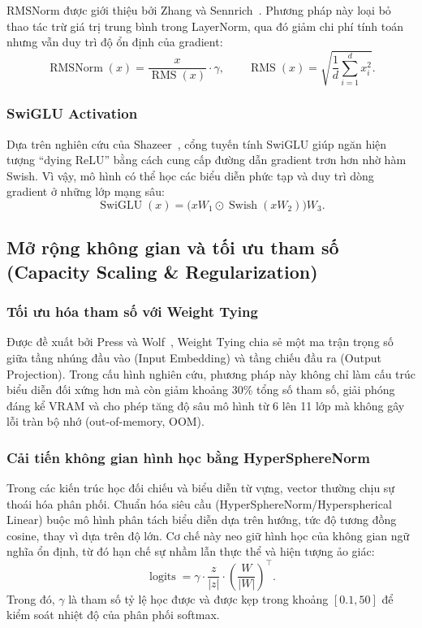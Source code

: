 \documentclass[11pt,a4paper]{article}
\numberwithin{equation}{section}
\DeclareMathOperator{\RMS}{RMS}
\begin{document}
RMSNorm được giới thiệu bởi Zhang và Sennrich~\cite{zhang2019rmsnorm}. Phương pháp này loại bỏ thao tác trừ giá trị trung bình trong LayerNorm, qua đó giảm chi phí tính toán nhưng vẫn duy trì độ ổn định của gradient:
\begin{equation}
\operatorname{RMSNorm}(x)
=\frac{x}{\RMS(x)}\cdot\gamma,
\qquad
\RMS(x)=\sqrt{\frac{1}{d}\sum_{i=1}^{d}x_i^2}.
\label{eq:rmsnorm}
\end{equation}

\subsubsection{SwiGLU Activation}

Dựa trên nghiên cứu của Shazeer~\cite{shazeer2020glu}, cổng tuyến tính SwiGLU giúp ngăn hiện tượng ``dying ReLU'' bằng cách cung cấp đường dẫn gradient trơn hơn nhờ hàm Swish. Vì vậy, mô hình có thể học các biểu diễn phức tạp và duy trì dòng gradient ở những lớp mạng sâu:
\begin{equation}
\operatorname{SwiGLU}(x)
=\bigl(xW_1\odot\operatorname{Swish}(xW_2)\bigr)W_3.
\label{eq:swiglu}
\end{equation}

\subsection{Mở rộng không gian và tối ưu tham số (Capacity Scaling \& Regularization)}

\subsubsection{Tối ưu hóa tham số với Weight Tying}

Được đề xuất bởi Press và Wolf~\cite{press2017using}, Weight Tying chia sẻ một ma trận trọng số giữa tầng nhúng đầu vào (Input Embedding) và tầng chiếu đầu ra (Output Projection). Trong cấu hình nghiên cứu, phương pháp này không chỉ làm cấu trúc biểu diễn đối xứng hơn mà còn giảm khoảng 30\% tổng số tham số, giải phóng đáng kể VRAM và cho phép tăng độ sâu mô hình từ 6 lên 11 lớp mà không gây lỗi tràn bộ nhớ (out-of-memory, OOM).

\subsubsection{Cải tiến không gian hình học bằng HyperSphereNorm}

Trong các kiến trúc học đối chiếu và biểu diễn từ vựng, vector thường chịu sự thoái hóa phân phối. Chuẩn hóa siêu cầu (HyperSphereNorm/Hyperspherical Linear) buộc mô hình phân tách biểu diễn dựa trên hướng, tức độ tương đồng cosine, thay vì dựa trên độ lớn. Cơ chế này neo giữ hình học của không gian ngữ nghĩa ổn định, từ đó hạn chế sự nhầm lẫn thực thể và hiện tượng ảo giác:
\begin{equation}
\operatorname{logits}
=\gamma\cdot\frac{z}{\lvert z\rvert}
\cdot\left(\frac{W}{\lvert W\rvert}\right)^{\!\top}.
\label{eq:hypersphere}
\end{equation}
Trong đó, $\gamma$ là tham số tỷ lệ học được và được kẹp trong khoảng $[0.1,50]$ để kiểm soát nhiệt độ của phân phối softmax.
\end{document}
